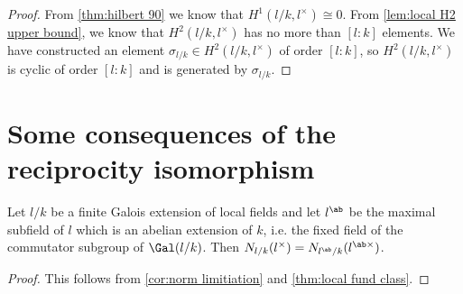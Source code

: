 \begin{proof}
	From \ref{thm:hilbert 90} we know that $H^1(l/k,l^\times) \cong 0$.
	From \ref{lem:local H2 upper bound}, we know that $H^2(l/k,l^\times)$ has no more than $[l:k]$
	elements.
	We have constructed an element $\sigma_{l/k}\in H^2(l/k,l^\times)$ of order $[l:k]$, so
	$H^2(l/k,l^\times)$ is cyclic of order $[l:k]$ and is generated by $\sigma_{l/k}$.
\end{proof}





\section{Some consequences of the reciprocity isomorphism}

\begin{theorem} \label{thm:local norm limitation}
	Let $l/k$ be a finite Galois extension of local fields and let $l^{\ab}$ be the
	maximal subfield of $l$ which is an abelian extension of $k$, i.e. the fixed field of
	the commutator subgroup of $\Gal(l/k)$.
	Then $N_{l/k}(l^\times) = N_{l^\ab/k}(l^{\ab\times})$.
\end{theorem}

\begin{proof}
	This follows from \ref{cor:norm limitiation} and \ref{thm:local fund class}.
\end{proof}



